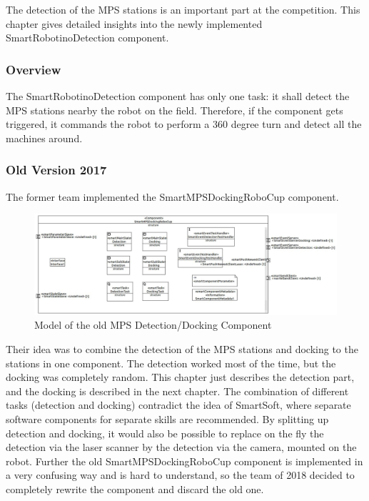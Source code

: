 The detection of the MPS stations is an important part at the competition. This chapter gives detailed insights into the newly implemented SmartRobotinoDetection component. 


\subsubsection{Overview}

The SmartRobotinoDetection component has only one task: it shall detect the MPS stations nearby the robot on the field. Therefore, if the component gets triggered, it commands the robot to perform a 360 degree turn and detect all the machines around.

\subsubsection{Old Version 2017}
The former team implemented the SmartMPSDockingRoboCup component. 

\begin{figure}[h]
\centering
\includegraphics[scale=0.4]{pic/SmartMPSDockingRoboCup.jpg}
\caption{Model of the old MPS Detection/Docking Component}
\label{fig:dockingold_overview}
\end{figure}

Their idea was to combine the detection of the MPS stations and docking to the stations in one component. The detection worked most of the time, but the docking was completely random. This chapter just describes the detection part, and the docking is described in the next chapter. 
The combination of different tasks (detection and docking) contradict the idea of SmartSoft, where separate software components for separate  skills are recommended. By splitting up detection and docking, it would also be possible to replace on the fly the detection via the laser scanner by the detection via the camera, mounted on the robot.
Further the old SmartMPSDockingRoboCup component is implemented in a very confusing way and is hard to understand, so the team of 2018 decided to completely rewrite the component and discard the old one.


